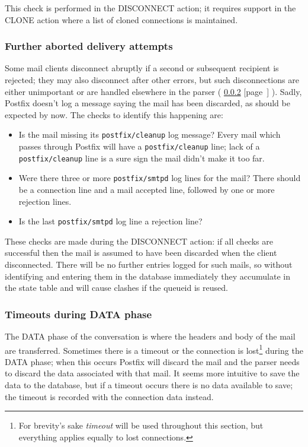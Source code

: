 \documentclass[a4paper,12pt,draft]{article}
\newcommand{\refwithpage}[1]{%
    \empty{}\ref{#1} [page~\pageref{#1}]%
}
\newcommand{\sectionref}[1]{%
    \textsection{}\refwithpage{#1}%
}
\newcommand{\daemon}[1]{%
    \texttt{postfix/#1}%
}
\begin{document}
This check is performed in the DISCONNECT action; it requires support in
the CLONE action where a list of cloned connections is maintained.

\subsubsection{Further aborted delivery attempts}

Some mail clients disconnect abruptly if a second or subsequent recipient
is rejected; they may also disconnect after other errors, but such
disconnections are either unimportant or are handled elsewhere in the
parser (\sectionref{timeouts-during-data-phase}).  Sadly, Postfix doesn't
log a message saying the mail has been discarded, as should be expected by
now.  The checks to identify this happening are:

\begin{itemize}

    \item Is the mail missing its \daemon{cleanup} log message?  Every mail
        which passes through Postfix will have a \daemon{cleanup} line;
        lack of a \daemon{cleanup} line is a sure sign the mail didn't make
        it too far.

    \item Were there three or more \daemon{smtpd} log lines for the mail?
        There should be a connection line and a mail accepted line,
        followed by one or more rejection lines.

    \item Is the last \daemon{smtpd} log line a rejection line?

\end{itemize}

These checks are made during the DISCONNECT action: if all checks are
successful then the mail is assumed to have been discarded when the client
disconnected.  There will be no further entries logged for such mails, so
without identifying and entering them in the database immediately they
accumulate in the state table and will cause clashes if the queueid is
reused.

\subsubsection{Timeouts during DATA phase}

\label{timeouts-during-data-phase}

The DATA phase of the \SMTP{} conversation is where the headers and body of
the mail are transferred.  Sometimes there is a timeout or the connection
is lost\footnote{For brevity's sake \textit{timeout\/} will be used
throughout this section, but everything applies equally to lost
connections.} during the DATA phase; when this occurs Postfix will discard
the mail and the parser needs to discard the data associated with that
mail.  It seems more intuitive to save the data to the database, but if a
timeout occurs there is no data available to save; the timeout is recorded
with the connection data instead.
\end{document}
